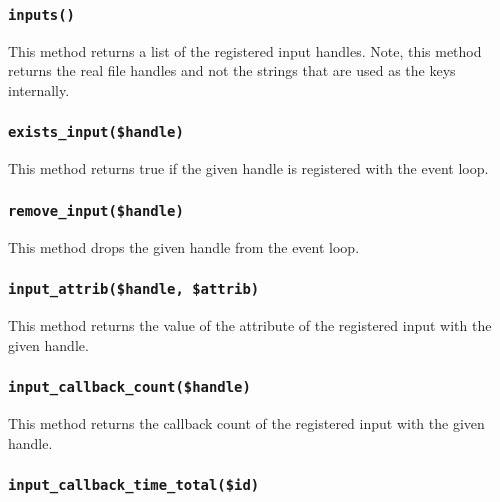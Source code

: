 \subsubsection*{\texttt{inputs()}\label{xPL::Listener_inputs_}}


This method returns a list of the registered input handles.  Note,
this method returns the real file handles and not the strings that
are used as the keys internally.

\subsubsection*{\texttt{exists\_input(\$handle)}\label{xPL::Listener_exists_input_handle_}}


This method returns true if the given handle is registered with the
event loop.

\subsubsection*{\texttt{remove\_input(\$handle)}\label{xPL::Listener_remove_input_handle_}}


This method drops the given handle from the event loop.

\subsubsection*{\texttt{input\_attrib(\$handle, \$attrib)}\label{xPL::Listener_input_attrib_handle_attrib_}}


This method returns the value of the attribute of the registered input with
the given handle.

\subsubsection*{\texttt{input\_callback\_count(\$handle)}\label{xPL::Listener_input_callback_count_handle_}}


This method returns the callback count of the registered input with
the given handle.

\subsubsection*{\texttt{input\_callback\_time\_total(\$id)}\label{xPL::Listener_input_callback_time_total_id_}}


